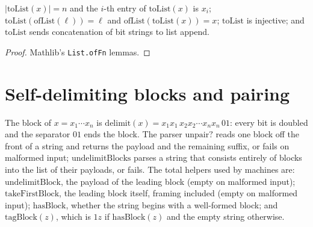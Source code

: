 \begin{lemma}
  \label{lem:encodings-bitstring-roundtrip}
  \leanok
  $|\mathrm{toList}(x)| = n$ and the $i$-th entry of $\mathrm{toList}(x)$ is
  $x_i$; $\mathrm{toList}(\mathrm{ofList}(\ell)) = \ell$
  and $\mathrm{ofList}(\mathrm{toList}(x)) = x$; $\mathrm{toList}$ is
  injective; and $\mathrm{toList}$ sends concatenation of bit strings to list
  append.
\end{lemma}
\begin{proof}
  \leanok
  Mathlib's \texttt{List.ofFn} lemmas.
\end{proof}

\section{Self-delimiting blocks and pairing}

\begin{definition}
  \label{def:encodings-delimit}
  \leanok
  The block of $x = x_1 \cdots x_n$ is
  $\mathrm{delimit}(x) = x_1 x_1\, x_2 x_2 \cdots x_n x_n\, 0 1$: every bit is
  doubled and the separator $01$ ends the block. The parser
  $\mathrm{unpair?}$ reads one block off the front of a string and returns the
  payload and the remaining suffix, or fails on malformed input;
  $\mathrm{undelimitBlocks}$ parses a string that consists entirely of blocks
  into the list of their payloads, or fails. The total helpers used by
  machines are: $\mathrm{undelimitBlock}$, the payload of the leading block
  (empty on malformed input); $\mathrm{takeFirstBlock}$, the leading block
  itself, framing included (empty on malformed input); $\mathrm{hasBlock}$,
  whether the string begins with a well-formed block; and
  $\mathrm{tagBlock}(z)$, which is $1z$ if $\mathrm{hasBlock}(z)$ and the
  empty string otherwise.
\end{definition}


